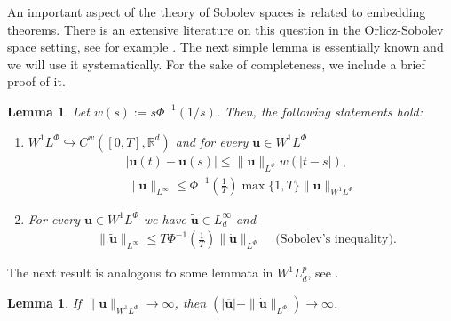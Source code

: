 \documentclass[twoside]{article}
\newtheorem{lem}[thm]{Lemma}
\theoremstyle{remark}
\newcommand{\orlnor}{\|_{L^{\Phi}}}
\newcommand{\lphi}{L^{\Phi}}
\newcommand{\wphi}{W^{1}\lphi}
\newcommand{\sobnor}{\|_{W^{1}\lphi}}
\renewcommand{\b}[1]{\boldsymbol{#1}}
\newcommand{\rr}{\mathbb{R}}
\renewcommand{\leq}{\leqslant}
\begin{document}
 An important aspect of the theory of Sobolev spaces is related to embedding theorems. There is an extensive literature on this question in the  Orlicz-Sobolev space setting, see for example
 \cite{cianchi2000fully,cianchi1999some,claverooptimal,edmunds2000optimal,kerman2006optimal}.
The next simple lemma is essentially known and we will use it systematically. For the sake of completeness, we include a brief proof of it.



\begin{lem}\label{inclusion orlicz} Let  $w(s):= s\Phi^{-1}(1/s)$. Then, the following statements hold:
\begin{enumerate}
\item\label{inclusion orlicz_item1} $\wphi\hookrightarrow C^w([0,T],\rr^d) $ and for every $\b{u}\in\wphi$
\begin{align}
 &\left|\b{u}(t)-\b{u}(s) \right| \leq  \|\b{\dot{u}}\orlnor w(| t-s|),&\label{in-sob-cont}
\\
& \|\b{u}\|_{L^{\infty}} \leq\Phi^{-1}\left(\frac{1}{T}\right)\max\{1,T\}\|\b{u}\sobnor&\label{sobolev}
\end{align}
\item For every $\b{u}\in\wphi$ we have $\widetilde{\b{u}}\in L^{\infty}_d$ and 
\begin{align}
& \|\widetilde{\b{u}}\|_{L^{\infty}} \leq T\Phi^{-1}\left(\frac{1}{T}\right)\|\b{\dot u}\orlnor&\text{  (Sobolev's inequality).}\label{wirtinger}
\end{align}




\end{enumerate}
\end{lem}


The next result is analogous to some lemmata in $W^1L^p_d$, see \cite{xu2007some}.
\begin{lem}\label{infinito-a-prom-upunto}
If $\|\b{u}\sobnor\to \infty$, then $(|\b{\overline u}|+\|\b{\dot u}\orlnor)\to \infty$.
\end{lem}
\end{document}
